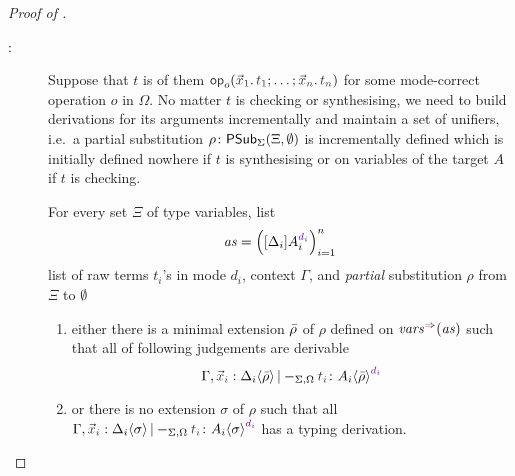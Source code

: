 \begin{proof}[Proof of {}]
\begin{description}
    \item[:]
      Suppose that $t$ is of them $\tmOpts$ for some mode-correct operation $o$ in $\Omega$.
      No matter $t$ is checking or synthesising, we need to build derivations for its arguments incrementally and maintain a set of unifiers, i.e.\ a partial substitution $\rho\colon \mathsf{PSub}_{\Sigma}(\Xi,\emptyset)$ is incrementally defined which is initially defined nowhere if $t$ is synthesising or on variables of the target $A$ if $t$ is checking. 

  \begin{claim}\label{lem:args-induction}
    For every set $\Xi$ of type variables, list 
    \[
      \mathit{as} = \left([\Delta_i] A_{i}^{\dir{d_i}}\right)_{i = 1}^{n}
    \]
    list of raw terms $t_i$'s in mode $d_i$, context $\Gamma$, and \emph{partial} substitution $\rho$ from $\Xi$ to $\emptyset$
    \begin{enumerate}
      \item either there is a minimal extension $\bar{\rho}$ of $\rho$ defined on $\synvar(\mathit{as})$ such that all of following judgements are derivable
        \[
          \Gamma, \vars{x}_\isTerm{i} : \simsub{\Delta_i}{\ext{\rho}} |-_{\Sigma, \Omega} \isTerm{t_i} \colon \simsub{A_i}{\ext{\rho}}^{\dir{d_i}}
        \]

      \item or there is no extension $\sigma$ of $\rho$ such that all $\Gamma, \vars{x}_\isTerm{i} : \simsub{\Delta_i}{\sigma} |-_{\Sigma, \Omega} \isTerm{t_i} \colon \simsub{A_i}{\sigma}^{\dir{d_i}}$ has a typing derivation. 
    \end{enumerate}
  \end{claim}
  \end{description}
\end{proof}
